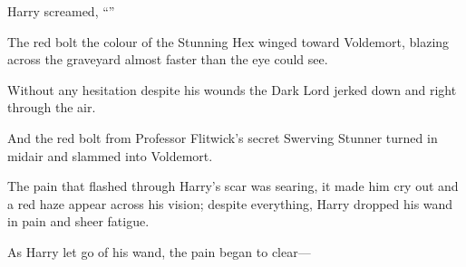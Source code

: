 Harry screamed, “”

The red bolt the colour of the Stunning Hex winged toward Voldemort, blazing across the graveyard almost faster than the eye could see.

Without any hesitation despite his wounds the Dark Lord jerked down and right through the air.

And the red bolt from Professor Flitwick’s secret Swerving Stunner turned in midair and slammed into Voldemort.

The pain that flashed through Harry’s scar was searing, it made him cry out and a red haze appear across his vision; despite everything, Harry dropped his wand in pain and sheer fatigue.

As Harry let go of his wand, the pain began to clear—
